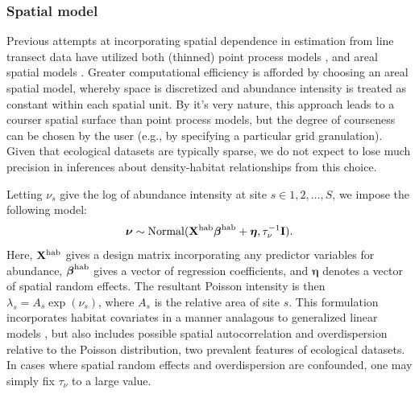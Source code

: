 \documentclass[10pt]{article}
\begin{document}
\subsubsection*{Spatial model}

Previous attempts at incorporating spatial dependence in estimation from line transect data have utilized both (thinned) point process models \cite{HedleyBuckland2004,JohnsonEtAl2010}, and areal spatial models \cite{SchmidtEtAl2012}.  Greater computational efficiency is afforded by choosing an areal spatial model, whereby space is discretized and abundance intensity is treated as constant within each spatial unit.  By it's very nature, this approach leads to a courser spatial surface than point process models, but the degree of courseness can be chosen by the user (e.g., by specifying a particular grid granulation).  Given that ecological datasets are typically sparse, we do not expect to lose much precision in inferences about density-habitat relationships from this choice.

Letting $\nu_s$ give the log of abundance intensity at site $s \in {1,2,\hdots,S}$, we impose the following model:
$$
 \boldsymbol{\nu} \sim {\rm Normal}({\bf X}^{\rm hab}
 \boldsymbol{\beta}^{\rm hab}+\boldsymbol{\eta},\tau_\nu^{-1}{\bf I}).
$$
Here, ${\bf X}^{\rm hab}$ gives a design matrix incorporating any predictor variables for abundance, $\boldsymbol{\beta}^{\rm hab}$ gives a vector of regression coefficients, and  $\boldsymbol{\eta}$ denotes a vector of spatial random effects.
The resultant Poisson intensity is then $\lambda_s=A_s \exp(\nu_s)$, where $A_s$ is the relative area of site $s$.  This formulation incorporates habitat covariates in a manner analagous to generalized linear models \cite{McCullaghNelder1989}, but also includes possible spatial autocorrelation and overdispersion relative to the Poisson distribution, two prevalent features of ecological datasets.  In cases where spatial random effects and overdispersion are confounded, one may simply fix $\tau_\nu$ to a large value.
\end{document}
